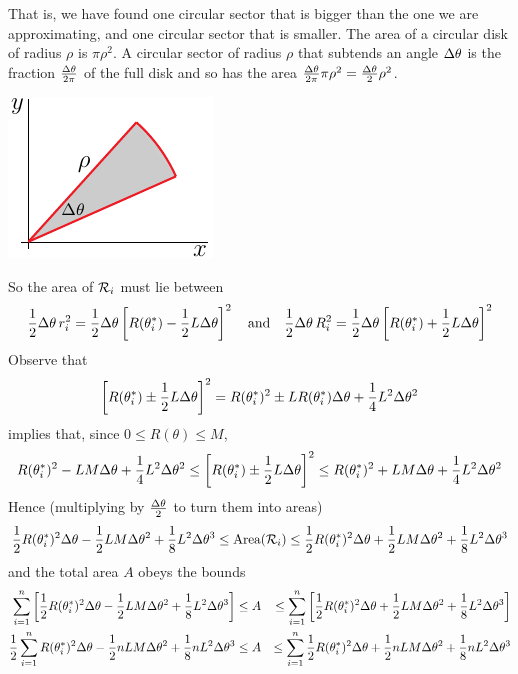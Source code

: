 That is, we have found one circular sector that is bigger than the one
we are approximating, and one circular sector that is smaller. 
The area of a circular disk of radius $\rho$ is $\pi\rho^2$.
A circular sector of radius $\rho$  that subtends an angle $\Delta \theta$
is the fraction $\frac{\Delta\theta}{2\pi}$ of the full disk and so has
the area $\frac{\Delta\theta}{2\pi}\pi\rho^2 = \frac{\Delta\theta}{2}\rho^2$.
\begin{efig}
\begin{center}
    \includegraphics{sectorArea.pdf}\qquad
\end{center}
\end{efig}
So the area of $\mathcal{R}_i$ must lie between
\begin{equation*}
\frac{1}{2}\Delta\theta\, r_i^2
    =\frac{1}{2}\Delta\theta\left[R(\theta_i^*)-\frac{1}{2} L\Delta\theta\right]^2
\quad\text{and}\quad
\frac{1}{2}\Delta\theta\, R_i^2
    =\frac{1}{2}\Delta\theta\left[R(\theta_i^*)+\frac{1}{2} L\Delta\theta\right]^2
\end{equation*}
Observe that
\begin{equation*}
\left[R(\theta_i^*)\pm \frac{1}{2} L\Delta\theta\right]^2
=R(\theta_i^*)^2 \pm L R(\theta_i^*)\Delta\theta +\frac{1}{4} L^2\Delta\theta^2
\end{equation*}
implies that, since $0\le R(\theta)\le M$,
\begin{equation*}
R(\theta_i^*)^2 - L M\Delta\theta +\frac{1}{4} L^2\Delta\theta^2
\le \left[R(\theta_i^*)\pm \frac{1}{2} L\Delta\theta\right]^2
\le R(\theta_i^*)^2 + L M\Delta\theta +\frac{1}{4} L^2\Delta\theta^2
\end{equation*}
Hence (multiplying by $\frac{\Delta\theta}{2}$ to turn them into areas)
\begin{equation*}
\frac{1}{2} R(\theta_i^*)^2\Delta\theta - \frac{1}{2} L M\Delta\theta^2 
           +\frac{1}{8} L^2\Delta\theta^3
\le\text{Area}(\mathcal{R}_i)
\le \frac{1}{2} R(\theta_i^*)^2\Delta\theta 
        + \frac{1}{2} L M\Delta\theta^2 +\frac{1}{8} L^2\Delta\theta^3
\end{equation*}
and the total area $A$ obeys the bounds
\begin{alignat*}{3}
\sum_{i=1}^n\left[ \frac{1}{2} R(\theta_i^*)^2\Delta\theta 
    - \frac{1}{2} L M\Delta\theta^2 +\frac{1}{8} L^2\Delta\theta^3\right]
&\le A
&\le \sum_{i=1}^n\left[\frac{1}{2} R(\theta_i^*)^2\Delta\theta 
       + \frac{1}{2} L M\Delta\theta^2 +\frac{1}{8} L^2\Delta\theta^3\right] \\
\frac{1}{2}\sum_{i=1}^n R(\theta_i^*)^2\Delta\theta 
  - \frac{1}{2}  n L M\Delta\theta^2 +\frac{1}{8} n L^2\Delta\theta^3
&\le A
&\le \sum_{i=1}^n\frac{1}{2} R(\theta_i^*)^2\Delta\theta + \frac{1}{2} n L M\Delta\theta^2 +\frac{1}{8} 
nL^2\Delta\theta^3
\end{alignat*}
